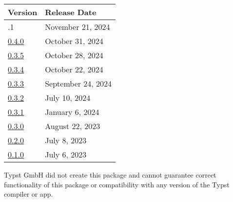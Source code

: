 \begin{longtable}[]{@{}ll@{}}
\toprule\noalign{}
Version & Release Date \\
\midrule\noalign{}
\endhead
\bottomrule\noalign{}
\endlastfoot
0.4.1 & November 21, 2024 \\
\href{https://typst.app/universe/package/acrostiche/0.4.0/}{0.4.0} &
October 31, 2024 \\
\href{https://typst.app/universe/package/acrostiche/0.3.5/}{0.3.5} &
October 28, 2024 \\
\href{https://typst.app/universe/package/acrostiche/0.3.4/}{0.3.4} &
October 22, 2024 \\
\href{https://typst.app/universe/package/acrostiche/0.3.3/}{0.3.3} &
September 24, 2024 \\
\href{https://typst.app/universe/package/acrostiche/0.3.2/}{0.3.2} &
July 10, 2024 \\
\href{https://typst.app/universe/package/acrostiche/0.3.1/}{0.3.1} &
January 6, 2024 \\
\href{https://typst.app/universe/package/acrostiche/0.3.0/}{0.3.0} &
August 22, 2023 \\
\href{https://typst.app/universe/package/acrostiche/0.2.0/}{0.2.0} &
July 8, 2023 \\
\href{https://typst.app/universe/package/acrostiche/0.1.0/}{0.1.0} &
July 6, 2023 \\
\end{longtable}

Typst GmbH did not create this package and cannot guarantee correct
functionality of this package or compatibility with any version of the
Typst compiler or app.

